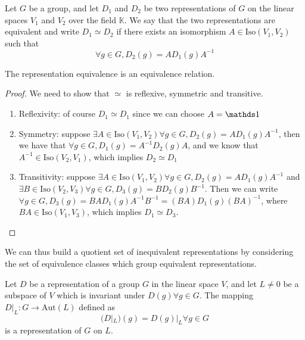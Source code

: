 \begin{definition}
    Let $G$ be a group, and let $D_1$ and $D_2$ be two representations of $G$ on the linear spaces $V_1$ and $V_2$ over the field $\mathbb{K}$.
    We say that the two representations are equivalent and write $D_1 \simeq D_2$ if there exists an isomorphism $A \in \text{Iso}(V_1, V_2)$ such that
    \begin{equation*}
        \forall g \in G, D_2(g) = A D_1(g) A^{-1}
    \end{equation*}
\end{definition}

\begin{proposition}
    The representation equivalence is an equivalence relation.
\end{proposition}
\begin{proof}
    We need to show that $\simeq$ is reflexive, symmetric and transitive.
    \begin{enumerate}
        \item Reflexivity: of course $D_1 \simeq D_1$ since we can choose $A = \idop$
        \item Symmetry: suppose $\exists A \in \text{Iso}(V_1,V_2) \forall g \in G, D_2(g) = A D_1(g) A^{-1}$, then we have that $\forall g \in G, D_1(g) = A^{-1} D_2(g) A$, and we know that $A^{-1} \in \text{Iso}(V_2, V_1)$, which implies $D_2 \simeq D_1$
        \item Transitivity: suppose $\exists A \in \text{Iso}(V_1,V_2) \forall g \in G, D_2(g) = A D_1(g) A^{-1}$ and $\exists B \in \text{Iso}(V_2,V_3) \forall g \in G, D_3(g) = B D_2(g) B^{-1}$. Then we can write $\forall g \in G, D_3(g) = B A D_1(g) A^{-1} B^{-1} = (BA) D_1(g) (BA)^{-1}$, where $BA \in \text{Iso}(V_1, V_3)$, which implies $D_1 \simeq D_3$.
    \end{enumerate}
\end{proof}
\begin{remark}
    We can thus build a quotient set of inequivalent representations by considering the set of equivalence classes which group equivalent representations.
\end{remark}

\begin{proposition}
    Let $D$ be a representation of a group $G$ in the linear space $V$, and let $L\neq 0$ be a subspace of $V$ which is invariant under $D(g) \forall g \in G$. The mapping $D |_L: G \rightarrow \text{Aut}(L)$ defined as
    \begin{equation*}
        (D|_L)(g) = D(g)|_L \forall g \in G 
    \end{equation*}
    is a representation of $G$ on $L$.
\end{proposition}

